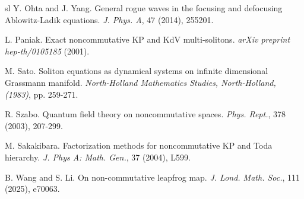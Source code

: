 \documentclass[11p,reqno]{amsart}
\numberwithin{equation}{section}
\numberwithin{equation}{section}
\begin{document}
\begin{thebibliography}{sl}
Y. Ohta and J. Yang.
General rogue waves in the focusing and defocusing Ablowitz-Ladik equations.
\emph{J. Phys. A}, 47 (2014), 255201.

L. Paniak. 
Exact noncommutative KP and KdV multi-solitons. 
\emph{arXiv preprint hep-th/0105185} (2001).

M. Sato. 
Soliton equations as dynamical systems on infinite dimensional Grassmann manifold.
\emph{North-Holland Mathematics Studies, North-Holland, (1983)}, pp. 259-271.

R. Szabo. 
Quantum field theory on noncommutative spaces.
\emph{Phys. Rept.}, 378 (2003), 207-299.

M. Sakakibara. 
Factorization methods for noncommutative KP and Toda hierarchy. 
\emph{J. Phys A: Math. Gen.}, 37 (2004), L599.

B. Wang and S. Li.
On non-commutative leapfrog map. 
\emph{J. Lond. Math. Soc.}, 111 (2025), e70063.

\end{thebibliography}
\end{document}

